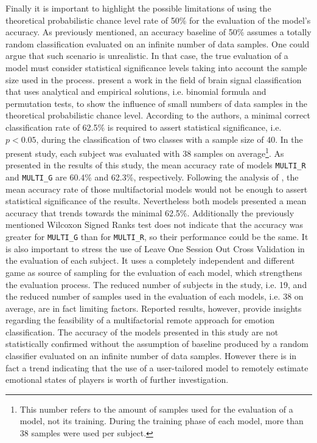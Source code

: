 Finally it is important to highlight the possible limitations of using the theoretical probabilistic chance level rate of 50\% for the evaluation of the model's accuracy. As previously mentioned, an accuracy baseline of 50\% assumes a totally random classification evaluated on an infinite number of data samples. One could argue that such scenario is unrealistic. In that case, the true evaluation of a model must consider statistical significance levels taking into account the sample size used in the process. \textcite{combrisson2015exceeding} present a work in the field of brain signal classification that uses analytical and empirical solutions, i.e. binomial formula and permutation tests, to show the influence of small numbers of data samples in the theoretical probabilistic chance level. According to the authors, a minimal correct classification rate of 62.5\% is required to assert statistical significance, i.e. $p < 0.05$, during the classification of two classes with a sample size of 40. In the present study, each subject was evaluated with 38 samples on average\footnote{This number refers to the amount of samples used for the evaluation of a model, not its training. During the training phase of each model, more than 38 samples were used per subject.}. As presented in the results of this study, the mean accuracy rate of models \texttt{MULTI\_R} and \texttt{MULTI\_G} are 60.4\% and 62.3\%, respectively. Following the analysis of \textcite{combrisson2015exceeding}, the mean accuracy rate of those multifactorial models would not be enough to assert statistical significance of the results. Nevertheless both models presented a mean accuracy that trends towards the minimal 62.5\%. Additionally the previously mentioned Wilcoxon Signed Ranks test does not indicate that the accuracy was greater for \texttt{MULTI\_G} than for \texttt{MULTI\_R}, so their performance could be the same. It is also important to stress the use of Leave One Session Out Cross Validation in the evaluation of each subject. It uses a completely independent and different game as source of sampling for the evaluation of each model, which strengthens the evaluation process. The reduced number of subjects in the study, i.e. 19, and the reduced number of samples used in the evaluation of each models, i.e. 38 on average, are in fact limiting factors. Reported results, however, provide insights regarding the feasibility of a multifactorial remote approach for emotion classification. The accuracy of the models presented in this study are not statistically confirmed without the assumption of baseline produced by a random classifier evaluated on an infinite number of data samples. However there is in fact a trend indicating that the use of a user-tailored model to remotely estimate emotional states of players is worth of further investigation.

